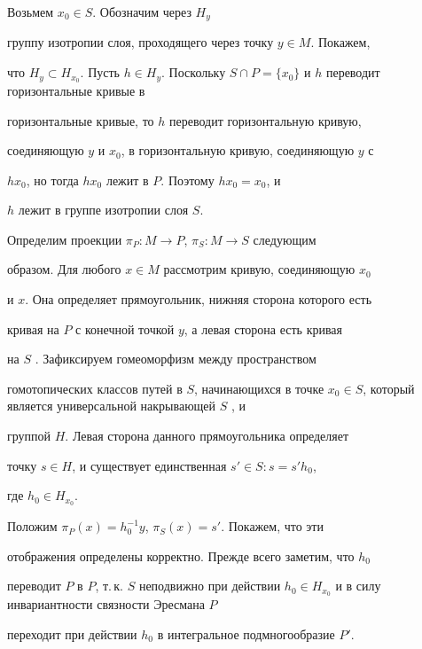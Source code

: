 \begin{pf}


Возьмем $x_0 \in S$. Обозначим через $H_y$


группу изотропии слоя, проходящего через точку $y \in M$. Покажем,


что $H_y \subset H_{x_0}$. Пусть $h \in H_y$. Поскольку $S


\cap P = \{x_0\}$ и $h$ переводит горизонтальные кривые в


горизонтальные кривые, то $h$ переводит горизонтальную кривую,


соединяющую $y$ и $x_0$, в горизонтальную кривую, соединяющую $y$ с


$h x_0$, но тогда $h x_0$ лежит в $P$. Поэтому $h x_0 = x_0$, и


$h$ лежит в группе изотропии слоя $S$.





Определим проекции $\pi_P: M \to P$, $\pi_S: M \to S$ следующим


образом. Для любого $x \in M$ рассмотрим кривую, соединяющую $x_0$


и $x$. Она определяет прямоугольник, нижняя сторона которого есть


кривая на $P$ с конечной точкой $y$, а левая сторона есть кривая


на $S$ \cite{BH}. Зафиксируем гомеоморфизм между пространством


гомотопических классов путей в $S$, начинающихся в точке $x_0 \in


S$, который является универсальной накрывающей $S$ \cite{FF}, и


группой $H$. Левая сторона данного прямоугольника определяет


точку $s \in H$, и существует единственная $s' \in S:s=s'h_0$,


где $h_0 \in H_{x_0}$.





Положим  $\pi_P(x)=h_0^{-1} y$, $\pi_S(x)=s'$. Покажем, что эти


отображения определены корректно. Прежде всего заметим, что $h_0$


переводит $P$ в $P$, т.\,к. $S$ неподвижно при действии $h_0 \in


H_{x_0}$ и в силу инвариантности связности Эресмана $P$


переходит при действии $h_0$ в интегральное подмногообразие $P'$.



\end{pf}

